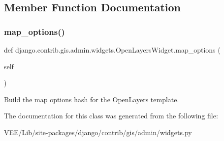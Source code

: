 \subsection{Member Function Documentation}
\mbox{\label{classdjango_1_1contrib_1_1gis_1_1admin_1_1widgets_1_1_open_layers_widget_a4c4b479d4f823874b55ca4c5b3dacc96}} 
\subsubsection{\texorpdfstring{map\+\_\+options()}{map\_options()}}
{\footnotesize\ttfamily def django.\+contrib.\+gis.\+admin.\+widgets.\+Open\+Layers\+Widget.\+map\+\_\+options (\begin{DoxyParamCaption}\item[{}]{self }\end{DoxyParamCaption})}

\begin{DoxyVerb}Build the map options hash for the OpenLayers template.\end{DoxyVerb}
 

The documentation for this class was generated from the following file\+:\begin{DoxyCompactItemize}
\item 
V\+E\+E/\+Lib/site-\/packages/django/contrib/gis/admin/widgets.\+py\end{DoxyCompactItemize}

